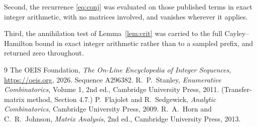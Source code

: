 \documentclass[11pt,a4paper]{article}
\theoremstyle{plain}
\theoremstyle{definition}
\begin{document}
Second, the recurrence \eqref{eq:conj} was evaluated on those published terms in exact
integer arithmetic, with no matrices involved, and vanishes wherever it applies.

Third, the annihilation test of Lemma~\ref{lem:crit} was carried to the full
Cayley--Hamilton bound in exact integer arithmetic rather than to a sampled prefix, and
returned zero throughout.

\begin{thebibliography}{9}
 The OEIS Foundation, \emph{The On-Line Encyclopedia of Integer
Sequences}, \url{https://oeis.org}, 2026. Sequence A296382.
 R.~P.~Stanley, \emph{Enumerative Combinatorics}, Volume 1, 2nd ed.,
Cambridge University Press, 2011. (Transfer-matrix method, Section 4.7.)
 P.~Flajolet and R.~Sedgewick, \emph{Analytic Combinatorics}, Cambridge
University Press, 2009.
 R.~A.~Horn and C.~R.~Johnson, \emph{Matrix Analysis}, 2nd ed., Cambridge
University Press, 2013.
\end{thebibliography}
\end{document}

